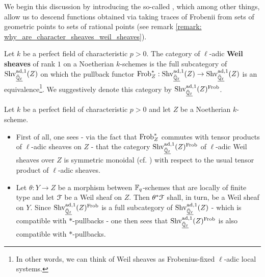             We begin this discussion by introducing the so-called , which among other things, allow us to descend functions obtained via taking traces of Frobenii from sets of geometric points to sets of rational points (see remark \ref{remark: why_are_character_sheaves_weil_sheaves}).
            \begin{definition} \label{def: weil_sheaves}
                Let $k$ be a perfect field of characteristic $p > 0$. The category of $\ell$-adic \textbf{Weil sheaves} of rank $1$ on a Noetherian $k$-schemes is the full subcategory of $\mathrm{Shv}_{\underline{\bar{\mathbb{Q}}_{\ell}}}^{\mathrm{ad}, 1}(Z)$ on which the pullback functor $\mathrm{Frob}_{Z}^*: \mathrm{Shv}_{\underline{\bar{\mathbb{Q}}_{\ell}}}^{\mathrm{ad}, 1}(Z) \to \mathrm{Shv}_{\underline{\bar{\mathbb{Q}}_{\ell}}}^{\mathrm{ad}, 1}(Z)$ is an equivalence\footnote{In other words, we can think of Weil sheaves as Frobenius-fixed $\ell$-adic local systems.}. We suggestively denote this category by $\mathrm{Shv}_{\underline{\bar{\mathbb{Q}}_{\ell}}}^{\mathrm{ad}, 1}(Z)^{\mathrm{Frob}}$.
            \end{definition}
            \begin{remark} \label{remark: properties_of_weil_sheaves}
                Let $k$ be a perfect field of characteristic $p > 0$ and let $Z$ be a Noetherian $k$-scheme. 
                \begin{itemize}
                    \item First of all, one sees - via the fact that $\mathrm{Frob}_Z^*$ commutes with tensor products of $\ell$-adic sheaves on $Z$ - that the category $\mathrm{Shv}_{\underline{\bar{\mathbb{Q}}_{\ell}}}^{\mathrm{ad}, 1}(Z)^{\mathrm{Frob}}$ of $\ell$-adic Weil sheaves over $Z$ is symmetric monoidal (cf. \cite[Definition 8.1.12]{EGNO}) with respect to the usual tensor product of $\ell$-adic sheaves.
                    \item \cite[Proposition 5.20]{tendler_2015_geometric_class_field_theory} Let $\theta: Y \to Z$ be a morphism between $\mathbb{F}_q$-schemes that are locally of finite type and let $\mathcal{F}$ be a Weil sheaf on $Z$. Then $\theta^*\mathcal{F}$ shall, in turn, be a Weil sheaf on $Y$. Since $\mathrm{Shv}_{\underline{\bar{\mathbb{Q}}_{\ell}}}^{\mathrm{ad}, 1}(Z)^{\mathrm{Frob}}$ is a full subcategory of $\mathrm{Shv}_{\underline{\bar{\mathbb{Q}}_{\ell}}}^{\mathrm{ad}, 1}(Z)$ - which is compatible with $*$-pullbacks - one then sees that $\mathrm{Shv}_{\underline{\bar{\mathbb{Q}}_{\ell}}}^{\mathrm{ad}, 1}(Z)^{\mathrm{Frob}}$ is also compatible with $*$-pullbacks.
                \end{itemize}
            \end{remark}
            
